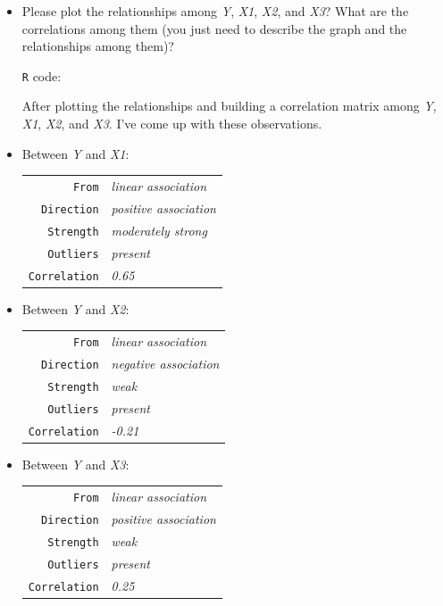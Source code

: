\documentclass[12pt,letterpaper]{article}
\begin{document}
	\begin{itemize}
		
		\item
		Please plot the relationships among \emph{Y}, \emph{X1}, \emph{X2}, and \emph{X3}? What are the correlations among them (you just need to describe the graph and the relationships among them)?
		\vspace{.25cm}
			
		\texttt {R} code:
		
		

		After plotting the relationships and building a correlation matrix among \emph{Y}, \emph{X1}, \emph{X2}, and \emph{X3}. I've come up with these observations.
		\item
		Between \emph{Y} and \emph{X1}:
		\begin{tabular}{r|l}
			\texttt{From} &\emph{linear association} \\
			\texttt{Direction} & \emph{positive association}\\
			\texttt{Strength} &\emph{moderately strong} \\
			\texttt{Outliers} &  \emph{present}\\
			\texttt{Correlation} &  \emph{0.65} \\
		\end{tabular}
		\item
		Between \emph{Y} and \emph{X2}:
		\begin{tabular}{r|l}
			\texttt{From} &\emph{linear association} \\
			\texttt{Direction} & \emph{negative association}\\
			\texttt{Strength} &\emph{weak} \\
			\texttt{Outliers} &  \emph{present}\\
			\texttt{Correlation} &  \emph{-0.21} \\
		\end{tabular}
		\item
		Between \emph{Y} and \emph{X3}:
		\begin{tabular}{r|l}
			\texttt{From} &\emph{linear association} \\
			\texttt{Direction} & \emph{positive association}\\
			\texttt{Strength} &\emph{weak} \\
			\texttt{Outliers} &  \emph{present}\\
			\texttt{Correlation} &  \emph{0.25} \\

\end{tabular}
\end{itemize}
\end{document}
